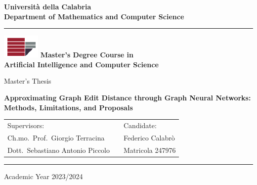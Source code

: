 \documentclass[../Thesis.tex]{subfiles}
\begin{document}

\begin{titlepage}
\begin{center}
\textbf{\LARGE Università della Calabria}\\
\textbf{Department of Mathematics and Computer Science}\\
\vskip 6pt
\hrule
\vskip 8pt
\includegraphics{Images/unical-logo.png}
\vskip 8pt
\textbf{Master's Degree Course in \\ Artificial Intelligence and Computer Science}

\vskip 32pt
Master's Thesis

\vskip 32pt
{ \huge \bfseries Approximating Graph Edit Distance through Graph Neural Networks: Methods, Limitations, and Proposals}\\[0.4cm]
\vskip 100pt


  \begin{tabular}{lp{5cm}l}
    Supervisors: & & Candidate:\\
    Ch.mo.~Prof.~Giorgio Terracina & & Federico Calabrò \\
    Dott.~Sebastiano Antonio Piccolo & & Matricola 247976\\
  \end{tabular}  



\vskip 100pt
\hrule
\vskip 6pt
Academic Year 2023/2024
\vfill
\end{center}

\end{titlepage}
\end{document}
